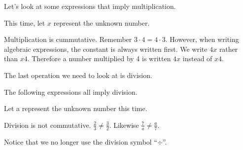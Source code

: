 Let's look at some expressions that imply multiplication.

This time, let $x$ represent the unknown number.

\begin{center}
\end{center}
\begin{fact}
Multiplication is cummutative. Remember $3\cdot 4=4\cdot3$. However, when writing algebraic expressions, the constant is always written first. We write $4x$ rather than $x4$. Therefore a number multiplied by 4 is written $4x$ instead of $x4$.
\end{fact}
The last operation we need to look at is division.

The following expressions all imply division.

Let a represent the unknown number this time.
\begin{center}
\end{center}
\begin{thinkback}
Division is not commutative. $\frac{2}{3}\neq\frac{3}{2}$. Likewise $\frac{7}{a}\neq\frac{a}{7}$.
\end{thinkback}
Notice that we no longer use the division symbol “$\div$”.

